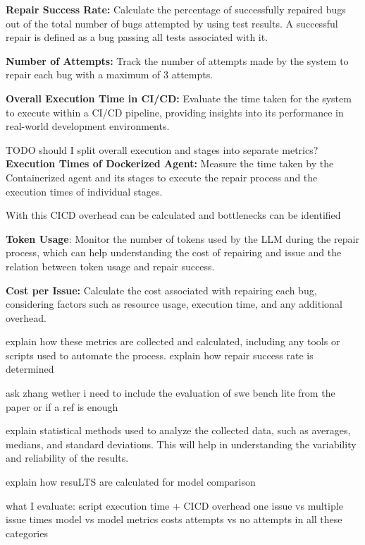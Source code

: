 \textbf{Repair Success Rate:} Calculate the percentage of successfully repaired bugs out of the total number of bugs attempted by using test results.
A successful repair is defined as a bug passing all tests associated with it.


\textbf{Number of Attempts:} Track the number of attempts made by the system to repair each bug with a maximum of 3 attempts.


\textbf{Overall Execution Time in CI/CD:} Evaluate the time taken for the system to execute within a CI/CD pipeline, providing insights into its performance in real-world development environments.


TODO should I split overall execution and stages into separate metrics?
\textbf{Execution Times of Dockerized Agent:} Measure the time taken by the Containerized agent and its stages to execute the repair process and the  execution times of individual stages.

With this CICD overhead can be calculated and bottlenecks can be identified


\textbf{Token Usage}: Monitor the number of tokens used by the LLM during the repair process, which can help understanding the cost of repairing and issue and the relation between token usage and repair success.


\textbf{Cost per Issue:} Calculate the cost associated with repairing each bug, considering factors such as resource usage, execution time, and any additional overhead.


explain how these metrics are collected and calculated, including any tools or scripts used to automate the process.
explain how repair success rate is determined

ask zhang wether i need to include the evaluation of swe bench lite from the paper or if a ref is enough

explain statistical methods used to analyze the collected data, such as averages, medians, and standard deviations. This will help in understanding the variability and reliability of the results.

explain how resuLTS are calculated for model comparison

what I evaluate:
script execution time + CICD overhead
one issue vs multiple issue times
model vs model metrics
costs
attempts vs no attempts in all these categories